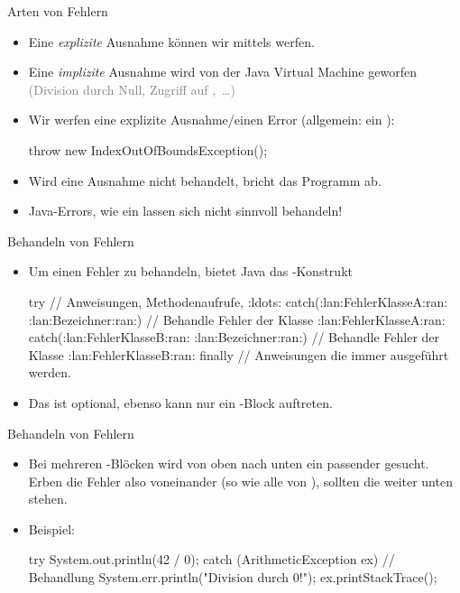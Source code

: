 \begin{frame}[fragile]{Arten von Fehlern}
    \begin{itemize}[<+(1)->]
        \widei
        \item Eine \emph{explizite} Ausnahme können wir mittels  werfen.
        \item Eine \emph{implizite} Ausnahme wird von der Java Virtual Machine geworfen \textcolor{gray}{(Division durch Null, Zugriff auf ,~\ldots)}
        \item Wir werfen eine explizite Ausnahme/einen Error (allgemein: ein ): \pause{}
\begin{plainjava}
throw new IndexOutOfBoundsException();
\end{plainjava}
        \item Wird eine Ausnahme nicht behandelt, bricht das Programm ab.
        \item Java-Errors, wie ein  lassen sich nicht sinnvoll behandeln!
    \end{itemize}
\end{frame}

\begin{frame}[fragile]{Behandeln von Fehlern}
    \begin{itemize}[<+(1)->]
        \widei
        \item Um einen Fehler zu behandeln, bietet Java das -Konstrukt
\begin{plainjava}
try {
    // Anweisungen, Methodenaufrufe, :ldots:
} catch(:lan:FehlerKlasseA:ran: :lan:Bezeichner:ran:) {
    // Behandle Fehler der Klasse :lan:FehlerKlasseA:ran:
} catch(:lan:FehlerKlasseB:ran: :lan:Bezeichner:ran:) {
    // Behandle Fehler der Klasse :lan:FehlerKlasseB:ran:
} finally {
    // Anweisungen die immer ausgeführt werden.
}
\end{plainjava}
        \item Das  ist optional, ebenso kann nur ein -Block auftreten.
    \end{itemize}
\end{frame}


\begin{frame}[fragile]{Behandeln von Fehlern}
    \begin{itemize}[<+(1)->]
        \widei
        \item Bei mehreren -Blöcken wird von oben nach unten ein passender gesucht.\pause{} Erben die Fehler also voneinander (so wie alle von ),\pause{} sollten die  weiter unten stehen.
        \item Beispiel:\pause{}
\begin{plainjava}
try {
    System.out.println(42 / 0);
} catch (ArithmeticException ex) {
    // Behandlung
    System.err.println("Division durch 0!");
    ex.printStackTrace();
}
\end{plainjava}
    \end{itemize}
\end{frame}


